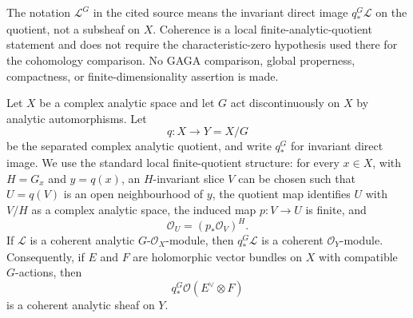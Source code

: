 \begin{lemma}
\label{lemma-discontinuous-analytic-invariant-direct-image-coherent}
\begin{reference}
\cite[Chapter V, \S 5.6, p. 219]{Tohoku}
\cite[Theorems 1 and 2, pp. 1--6]{Cartan-analytic-quotient}
\cite[Hauptsatz I, p. 57]{Grauert-direct-image}
\end{reference}
\begin{history}
The notation $\mathcal L^G$ in the cited source means the invariant direct
image $q_*^G\mathcal L$ on the quotient, not a subsheaf on $X$. Coherence is
a local finite-analytic-quotient statement and does not require the
characteristic-zero hypothesis used there for the cohomology comparison. No
GAGA comparison, global properness, compactness, or finite-dimensionality
assertion is made.
\end{history}
Let $X$ be a complex analytic space and let $G$ act discontinuously on $X$
by analytic automorphisms. Let
$$
q:X\longrightarrow Y=X/G
$$
be the separated complex analytic quotient, and write $q_*^G$ for invariant
direct image. We use the standard local finite-quotient structure: for every
$x\in X$, with $H=G_x$ and $y=q(x)$, an $H$-invariant slice $V$ can be
chosen such that $U=q(V)$ is an open neighbourhood of $y$, the quotient map
identifies $U$ with $V/H$ as a complex analytic space, the induced map
$p:V\to U$ is finite, and
$$
\mathcal O_U=(p_*\mathcal O_V)^H.
$$
If $\mathcal L$ is a coherent analytic $G$-$\mathcal O_X$-module,
then $q_*^G\mathcal L$ is a coherent $\mathcal O_Y$-module.
Consequently, if $E$ and $F$ are holomorphic vector bundles on $X$ with
compatible $G$-actions, then
$$
q_*^G\mathcal O(E^\vee\otimes F)
$$
is a coherent analytic sheaf on $Y$.
\end{lemma}

